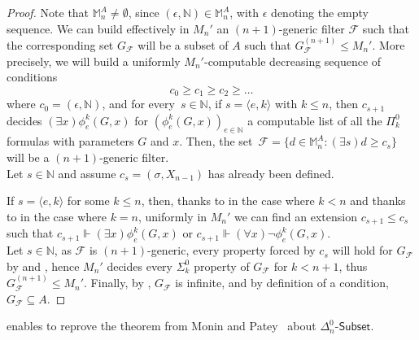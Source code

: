 \documentclass{article}
\def\NN{\mathbb{N}}
\def\MM{\mathbb{M}}
\def\F{\mathcal{F}}
\newcommand{\Sub}[1]{{#1}\mbox{-}\mathsf{Subset}}
\numberwithin{theorem}{section}
\theoremstyle{definition}
\begin{document}
\begin{proof}
Note that $\MM^A_n \neq \emptyset$, since $(\epsilon,\NN) \in \MM^A_n$, with $\epsilon$ denoting the empty sequence. We can build effectively in $M_n'$ an $(n+1)$-generic filter $\F$ such that the corresponding set $G_{\F}$ will be a subset of $A$ such that $G_{\F}^{(n+1)} \leq M_n'$. More precisely, we will build a uniformly $M_n'$-computable decreasing sequence of conditions 
$$
c_0 \geq c_1 \geq c_2 \geq \dots
$$
where $c_0 = (\epsilon, \NN)$, and for every~$s \in \NN$, if $s = \langle e,k \rangle$ with $k \leq n$, then $c_{s+1}$ decides $(\exists x) \phi_e^k(G,x)$ for $(\phi_e^k(G,x))_{e \in \NN}$ a computable list of all the $\Pi_k^0$ formulas with parameters $G$ and $x$. Then, the set~$\F = \{ d \in \MM^A_n : (\exists s) d \geq c_s \}$ will be a $(n+1)$-generic filter. \\

Let $s \in \NN$ and assume $c_{s} = (\sigma, X_{n-1})$ has already been defined. 

If $s = \langle e,k \rangle$ for some $k \leq n$, then, thanks to  in the case where $k < n$ and thanks to  in the case where $k = n$, uniformly in $M_n'$ we can find an extension $c_{s+1}\leq c_{s}$ such that $c_{s+1} \Vdash (\exists x)\phi_e^k(G,x)$ or $c_{s+1} \Vdash (\forall x)\neg \phi_e^k(G,x)$. \\

Let $s \in \NN$, as $\F$ is $(n+1)$-generic, every property forced by $c_s$ will hold for $G_{\F}$ by  and , hence $M_n'$ decides every $\Sigma_k^0$ property of $G_{\F}$ for $k < n+1$, thus $G_{\F}^{(n+1)} \leq M_n'$. Finally, by , $G_{\F}$ is infinite, and by definition of a condition, $G_{\F} \subseteq A$.
\end{proof}

 enables to reprove the theorem from Monin and Patey~\cite{monin2021weakness} about $\Sub{\Delta^0_n}$.
\end{document}
